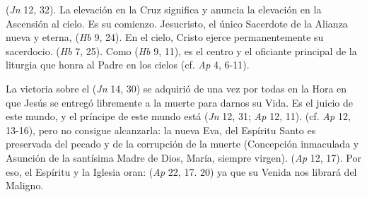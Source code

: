 \begin{ccebody}
  (\textit{Jn} 12, 32). La elevación en la Cruz significa y anuncia la elevación en la Ascensión al cielo. Es su comienzo. Jesucristo, el único Sacerdote de la Alianza nueva y eterna,  (\textit{Hb} 9, 24). En el cielo, Cristo ejerce permanentemente su sacerdocio.  (\textit{Hb} 7, 25). Como  (\textit{Hb} 9, 11), es el centro y el oficiante principal de la liturgia que honra al Padre en los cielos (cf. \textit{Ap} 4, 6-11).

 La victoria sobre el  (\textit{Jn} 14, 30) se adquirió de una vez por todas en la Hora en que Jesús se entregó libremente a la muerte para darnos su Vida. Es el juicio de este mundo, y el príncipe de este mundo está  (\textit{Jn} 12, 31; \textit{Ap} 12, 11).  (cf. \textit{Ap} 12, 13-16), pero no consigue alcanzarla: la nueva Eva,  del Espíritu Santo es preservada del pecado y de la corrupción de la muerte (Concepción inmaculada y Asunción de la santísima Madre de Dios, María, siempre virgen).  (\textit{Ap} 12, 17). Por eso, el Espíritu y la Iglesia oran:  (\textit{Ap} 22, 17. 20) ya que su Venida nos librará del Maligno.
\end{ccebody}


